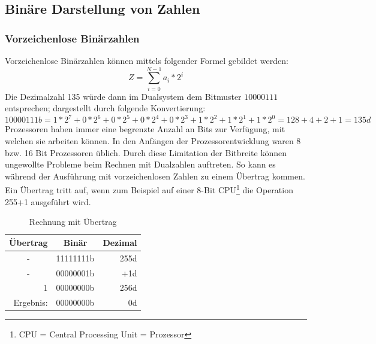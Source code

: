 \documentclass[a4paper,12pt]{article}
\begin{document}
\subsection{Binäre Darstellung von Zahlen}

\subsubsection{Vorzeichenlose Binärzahlen}
Vorzeichenlose Binärzahlen können mittels folgender Formel gebildet werden: $$Z=\sum\limits_{i=0}^{N-1} a_i * 2^i$$ 
Die Dezimalzahl 135 würde dann im Dualsystem dem Bitmuster $10000111$ entsprechen; dargestellt durch folgende Konvertierung:
$$10000111b = 1*2^7+0*2^6+0*2^5+0*2^4+0*2^3+1*2^2+1*2^1+1*2^0 = 128 +4+2+1 = 135d$$
Prozessoren haben immer eine begrenzte Anzahl an Bits zur Verfügung, mit welchen sie arbeiten können. In den Anfängen der Prozessorentwicklung waren 8 bzw. 16 Bit Prozessoren üblich. Durch diese Limitation der Bitbreite können ungewollte Probleme beim Rechnen mit Dualzahlen auftreten. So kann es während der Ausführung mit vorzeichenlosen Zahlen zu einem Übertrag kommen. Ein Übertrag tritt auf, wenn zum Beispiel auf einer 8-Bit CPU\footnote{CPU =  Central Processing Unit = Prozessor} die Operation 255+1 ausgeführt wird.

\begin{table}[!htb]
\centering
\begin{tabular}{|c|r|r|}
\hline
\textbf{Übertrag}               & \multicolumn{1}{c|}{\textbf{Binär}} & \multicolumn{1}{c|}{\textbf{Dezimal}} \\ \hline
-                               & 11111111b                            & 255d                                   \\ \hline
-                               & 00000001b                            & +1d                                     \\ \hline
\multicolumn{1}{|r|}{1}         & 00000000b                            & 256d                                   \\ \hline\hline
\multicolumn{1}{|r|}{Ergebnis:} & 00000000b                            & 0d                                     \\ \hline
\end{tabular}
\caption{Rechnung mit Übertrag}
\label{tab:uebertrag}
\end{table}
\end{document}
